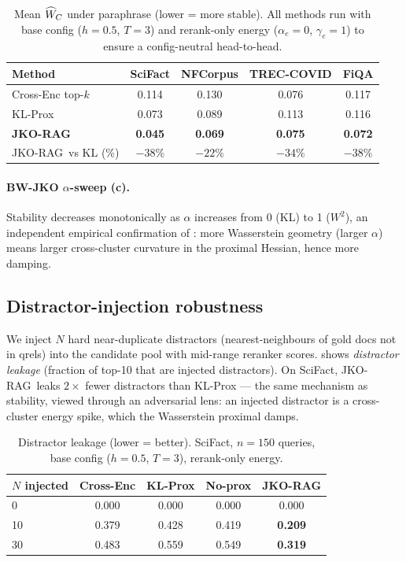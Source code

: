\documentclass{article}
\theoremstyle{plain}
\newcommand{\mWdist}{\widehat{W}_C}
\newcommand{\jko}{\textsc{JKO-RAG}}
\begin{document}
\begin{table}[h]
\centering\small
\caption{Mean $\protect\mWdist$ under paraphrase (lower = more stable). All methods run with base config ($h{=}0.5$, $T{=}3$) and rerank-only energy ($\alpha_e{=}0$, $\gamma_e{=}1$) to ensure a config-neutral head-to-head.}
\label{tab:stability}
\begin{tabular}{@{}lcccc@{}}
\toprule
Method & SciFact & NFCorpus & TREC-COVID & FiQA \\
\midrule
Cross-Enc top-$k$ & 0.114 & 0.130 & 0.076 & 0.117 \\
KL-Prox           & 0.073 & 0.089 & 0.113 & 0.116 \\
\textbf{\jko}     & \textbf{0.045} & \textbf{0.069} & \textbf{0.075} & \textbf{0.072} \\
\midrule
\jko\ vs KL (\%)  & $-38\%$ & $-22\%$ & $-34\%$ & $-38\%$ \\
\bottomrule
\end{tabular}
\end{table}

\paragraph{BW-JKO $\alpha$-sweep (c).}
Stability decreases monotonically as $\alpha$ increases from 0 (KL) to 1 ($W^2$), an independent empirical confirmation of : more Wasserstein geometry (larger $\alpha$) means larger cross-cluster curvature in the proximal Hessian, hence more damping.

\subsection{Distractor-injection robustness}
\label{sec:distractors}

We inject $N$ hard near-duplicate distractors (nearest-neighbours of gold docs not in qrels) into the candidate pool with mid-range reranker scores.  shows \emph{distractor leakage} (fraction of top-10 that are injected distractors). On SciFact, \jko\ leaks $2\times$ fewer distractors than KL-Prox --- the same mechanism as stability, viewed through an adversarial lens: an injected distractor is a cross-cluster energy spike, which the Wasserstein proximal damps.

\begin{table}[h]
\centering\small
\caption{Distractor leakage (lower = better). SciFact, $n{=}150$ queries, base config ($h{=}0.5$, $T{=}3$), rerank-only energy.}
\label{tab:distractors}
\begin{tabular}{@{}lcccc@{}}
\toprule
$N$ injected & Cross-Enc & KL-Prox & No-prox & \textbf{\jko} \\
\midrule
0  & 0.000 & 0.000 & 0.000 & 0.000 \\
10 & 0.379 & 0.428 & 0.419 & \textbf{0.209} \\
30 & 0.483 & 0.559 & 0.549 & \textbf{0.319} \\
\bottomrule
\end{tabular}
\end{table}
\end{document}
